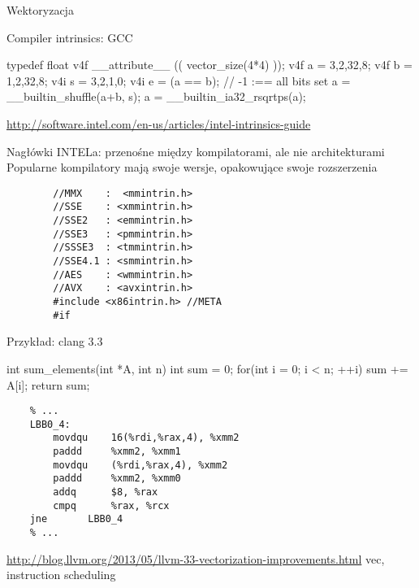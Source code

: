 \begin{frame}[fragile]{Wektoryzacja}
	\begin{block}{Compiler intrinsics: GCC}
		\begin{cpp}
			typedef float v4f __attribute__ (( vector_size(4*4) ));
			v4f a = {3,2,32,8};
			v4f b = {1,2,32,8};
			v4i s = {3,2,1,0};
			v4i e = (a == b); // -1 :== all bits set
			a = __builtin_shuffle(a+b, s);
			a = __builtin_ia32_rsqrtps(a);
		\end{cpp}
		\url{http://software.intel.com/en-us/articles/intel-intrinsics-guide}
	\end{block}
	\begin{block}{Nagłówki INTELa: przenośne między kompilatorami, ale nie architekturami}
		Popularne kompilatory mają swoje wersje, opakowujące swoje rozszerzenia
		\begin{verbatim}
		//MMX    :  <mmintrin.h>
		//SSE    : <xmmintrin.h>
		//SSE2   : <emmintrin.h>
		//SSE3   : <pmmintrin.h>
		//SSSE3  : <tmmintrin.h>
		//SSE4.1 : <smmintrin.h>
		//AES    : <wmmintrin.h>
		//AVX    : <avxintrin.h>
		#include <x86intrin.h> //META
		#if
		\end{verbatim}
	\end{block}
\end{frame}
\begin{frame}[fragile]{Przykład: clang 3.3}
	\begin{cpp}
	int sum_elements(int *A, int n) {
		int sum = 0;
		for(int i = 0; i < n; ++i)
			sum += A[i];
		return sum;
	}
	\end{cpp}
	\begin{verbatim}
	% ...
	LBB0_4:
		movdqu    16(%rdi,%rax,4), %xmm2
		paddd     %xmm2, %xmm1
		movdqu    (%rdi,%rax,4), %xmm2
		paddd     %xmm2, %xmm0
		addq      $8, %rax
		cmpq      %rax, %rcx
	jne       LBB0_4
	% ...
	\end{verbatim}
	\tiny\url{http://blog.llvm.org/2013/05/llvm-33-vectorization-improvements.html}
	vec, instruction scheduling
\end{frame}
